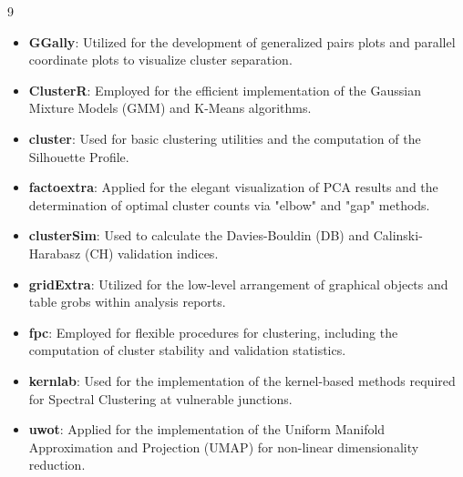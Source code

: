 \documentclass[conference]{IEEEtran}
\begin{document}
\begin{thebibliography}{9}
\begin{enumerate}
\begin{itemize}
	\item \textbf{GGally}: Utilized for the development of generalized pairs plots and parallel coordinate plots to visualize cluster separation.
	\item \textbf{ClusterR}: Employed for the efficient implementation of the Gaussian Mixture Models (GMM) and K-Means algorithms.
	\item \textbf{cluster}: Used for basic clustering utilities and the computation of the Silhouette Profile.
	\item \textbf{factoextra}: Applied for the elegant visualization of PCA results and the determination of optimal cluster counts via "elbow" and "gap" methods.
	\item \textbf{clusterSim}: Used to calculate the Davies-Bouldin (DB) and Calinski-Harabasz (CH) validation indices.
	\item \textbf{gridExtra}: Utilized for the low-level arrangement of graphical objects and table grobs within analysis reports.
	\item \textbf{fpc}: Employed for flexible procedures for clustering, including the computation of cluster stability and validation statistics.
	\item \textbf{kernlab}: Used for the implementation of the kernel-based methods required for Spectral Clustering at vulnerable junctions.
	\item \textbf{uwot}: Applied for the implementation of the Uniform Manifold Approximation and Projection (UMAP) for non-linear dimensionality reduction.
\end{itemize}
\end{enumerate}

	
\end{thebibliography}

\vspace{12pt}
\end{document}
